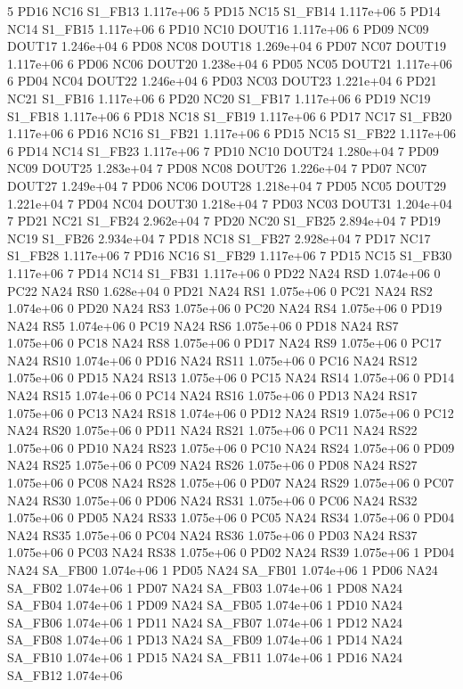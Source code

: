5 PD16 NC16 S1_FB13 1.117e+06 
5 PD15 NC15 S1_FB14 1.117e+06 
5 PD14 NC14 S1_FB15 1.117e+06 
6 PD10 NC10 DOUT16 1.117e+06 
6 PD09 NC09 DOUT17 1.246e+04 
6 PD08 NC08 DOUT18 1.269e+04 
6 PD07 NC07 DOUT19 1.117e+06 
6 PD06 NC06 DOUT20 1.238e+04 
6 PD05 NC05 DOUT21 1.117e+06 
6 PD04 NC04 DOUT22 1.246e+04 
6 PD03 NC03 DOUT23 1.221e+04 
6 PD21 NC21 S1_FB16 1.117e+06 
6 PD20 NC20 S1_FB17 1.117e+06 
6 PD19 NC19 S1_FB18 1.117e+06 
6 PD18 NC18 S1_FB19 1.117e+06 
6 PD17 NC17 S1_FB20 1.117e+06 
6 PD16 NC16 S1_FB21 1.117e+06 
6 PD15 NC15 S1_FB22 1.117e+06 
6 PD14 NC14 S1_FB23 1.117e+06 
7 PD10 NC10 DOUT24 1.280e+04 
7 PD09 NC09 DOUT25 1.283e+04 
7 PD08 NC08 DOUT26 1.226e+04 
7 PD07 NC07 DOUT27 1.249e+04 
7 PD06 NC06 DOUT28 1.218e+04 
7 PD05 NC05 DOUT29 1.221e+04 
7 PD04 NC04 DOUT30 1.218e+04 
7 PD03 NC03 DOUT31 1.204e+04 
7 PD21 NC21 S1_FB24 2.962e+04 
7 PD20 NC20 S1_FB25 2.894e+04 
7 PD19 NC19 S1_FB26 2.934e+04 
7 PD18 NC18 S1_FB27 2.928e+04 
7 PD17 NC17 S1_FB28 1.117e+06 
7 PD16 NC16 S1_FB29 1.117e+06 
7 PD15 NC15 S1_FB30 1.117e+06 
7 PD14 NC14 S1_FB31 1.117e+06 
0 PD22 NA24 RSD 1.074e+06 
0 PC22 NA24 RS0 1.628e+04 
0 PD21 NA24 RS1 1.075e+06 
0 PC21 NA24 RS2 1.074e+06 
0 PD20 NA24 RS3 1.075e+06 
0 PC20 NA24 RS4 1.075e+06 
0 PD19 NA24 RS5 1.074e+06 
0 PC19 NA24 RS6 1.075e+06 
0 PD18 NA24 RS7 1.075e+06 
0 PC18 NA24 RS8 1.075e+06 
0 PD17 NA24 RS9 1.075e+06 
0 PC17 NA24 RS10 1.074e+06 
0 PD16 NA24 RS11 1.075e+06 
0 PC16 NA24 RS12 1.075e+06 
0 PD15 NA24 RS13 1.075e+06 
0 PC15 NA24 RS14 1.075e+06 
0 PD14 NA24 RS15 1.074e+06 
0 PC14 NA24 RS16 1.075e+06 
0 PD13 NA24 RS17 1.075e+06 
0 PC13 NA24 RS18 1.074e+06 
0 PD12 NA24 RS19 1.075e+06 
0 PC12 NA24 RS20 1.075e+06 
0 PD11 NA24 RS21 1.075e+06 
0 PC11 NA24 RS22 1.075e+06 
0 PD10 NA24 RS23 1.075e+06 
0 PC10 NA24 RS24 1.075e+06 
0 PD09 NA24 RS25 1.075e+06 
0 PC09 NA24 RS26 1.075e+06 
0 PD08 NA24 RS27 1.075e+06 
0 PC08 NA24 RS28 1.075e+06 
0 PD07 NA24 RS29 1.075e+06 
0 PC07 NA24 RS30 1.075e+06 
0 PD06 NA24 RS31 1.075e+06 
0 PC06 NA24 RS32 1.075e+06 
0 PD05 NA24 RS33 1.075e+06 
0 PC05 NA24 RS34 1.075e+06 
0 PD04 NA24 RS35 1.075e+06 
0 PC04 NA24 RS36 1.075e+06 
0 PD03 NA24 RS37 1.075e+06 
0 PC03 NA24 RS38 1.075e+06 
0 PD02 NA24 RS39 1.075e+06 
1 PD04 NA24 SA_FB00 1.074e+06 
1 PD05 NA24 SA_FB01 1.074e+06 
1 PD06 NA24 SA_FB02 1.074e+06 
1 PD07 NA24 SA_FB03 1.074e+06 
1 PD08 NA24 SA_FB04 1.074e+06 
1 PD09 NA24 SA_FB05 1.074e+06 
1 PD10 NA24 SA_FB06 1.074e+06 
1 PD11 NA24 SA_FB07 1.074e+06 
1 PD12 NA24 SA_FB08 1.074e+06 
1 PD13 NA24 SA_FB09 1.074e+06 
1 PD14 NA24 SA_FB10 1.074e+06 
1 PD15 NA24 SA_FB11 1.074e+06 
1 PD16 NA24 SA_FB12 1.074e+06 
